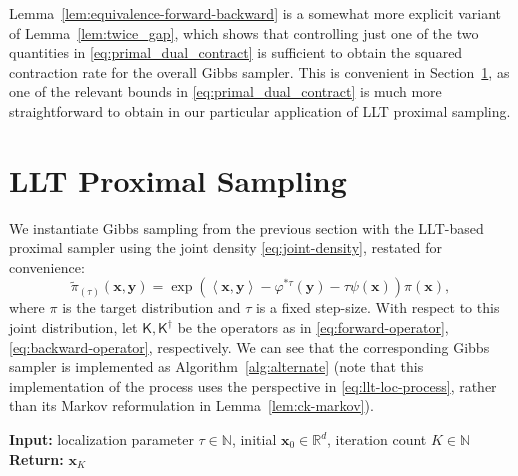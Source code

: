 \documentclass[11pt]{article}
\newcommand{\inprod}[2]{\left\langle#1, #2\right\rangle}
\newcommand{\R}{\mathbb{R}}
\newcommand{\N}{\mathbb{N}}
\newcommand{\Par}[1]{\left(#1\right)}
\newcommand{\0}{\mathbf{0}}
\newcommand{\1}{\mathbf{1}}
\newcommand{\vx}{\mathbf{x}}
\newcommand{\vy}{\mathbf{y}}
\newcommand{\sfK}{\mathsf{K}}
\newcommand{\tilt}{\mathcal{T}}
\newcommand{\vhi}{\varphi}
\begin{document}
Lemma~\ref{lem:equivalence-forward-backward} is a somewhat more explicit variant of Lemma~\ref{lem:twice_gap}, which shows that controlling just one of the two quantities in \eqref{eq:primal_dual_contract} is sufficient to obtain the squared contraction rate for the overall Gibbs sampler. This is convenient in Section~\ref{sec:llt_alternate_sampling}, as one of the relevant bounds in \eqref{eq:primal_dual_contract} is much more straightforward to obtain in our particular application of LLT proximal sampling.



\section{LLT Proximal Sampling}\label{sec:llt_alternate_sampling}

We instantiate Gibbs sampling from the previous section with the LLT-based proximal sampler using the joint density \eqref{eq:joint-density}, restated for convenience:
\[\tilde{\pi}_{(\tau)}(\vx, \vy)=\exp\Par{\inprod{\vx}{\vy}-\varphi^{*\tau}(\vy)-\tau\psi(\vx)}\pi(\vx),\]
where $\pi$ is the target distribution and $\tau$ is a fixed step-size.  With respect to this joint distribution, let $\sfK, \sfK^\dagger$ be the operators as in \eqref{eq:forward-operator}, \eqref{eq:backward-operator}, respectively.  We can see that the corresponding Gibbs sampler is implemented as Algorithm~\ref{alg:alternate} (note that this implementation of the process uses the perspective in \eqref{eq:llt-loc-process}, rather than its Markov reformulation in Lemma~\ref{lem:ck-markov}).

\begin{algorithm2e}[t!]
\caption{$\mathsf{LLT\text{-}Prox}(\tau, \vx_0, K)$}
\label{alg:alternate}
\DontPrintSemicolon
\textbf{Input: }localization parameter $\tau \in \N$, initial $\vx_0 \in \R^d$, iteration count $K \in \N$\\
\For{$0 \le k < K$}{
$\vy_k \sim \tilt_{\vx_k}\exp(-\vhi^{*\tau})$\; \label{line:sample_y}
$\vx_{k + 1} \sim \tilt_{\vy_k}\exp(-\tau\psi)\pi$\; \label{line:sample_x}
}
\textbf{Return:} $\vx_K$
\end{algorithm2e}
\end{document}
